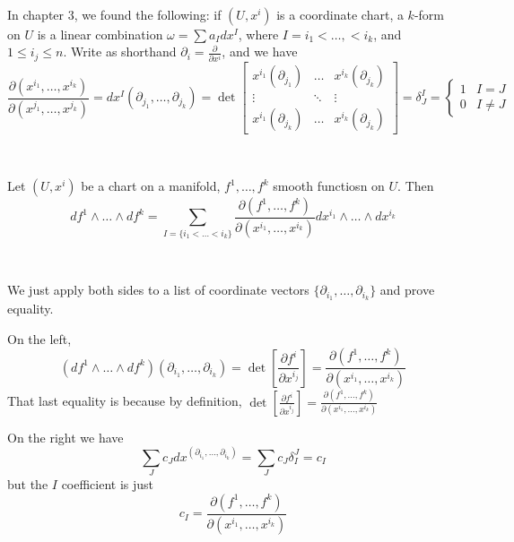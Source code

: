 \documentclass{article}
\begin{document}
\begin{remark}
  \

  In chapter 3, we found the following: if $(U,x^i)$ is a coordinate chart, a $k$-form on $U$ is a linear combination $\omega = \sum a_I dx^I$, where $I = i_1 < \dots, < i_k$, and $1 \leq i_j \leq n$. Write as shorthand $\partial_i = \frac{\partial}{\partial x^i}$, and we have $$\frac{\partial (x^{i_1}, \dots, x^{i_k})}{\partial (x^{j_1}, \dots, x^{j_k})} = dx^I(\partial_{j_1}, \dots, \partial_{j_k}) = \det
  \begin{bmatrix}
    x^{i_1}(\partial_{j_1}) & \dots & x^{i_k}(\partial_{j_k})\\
    \vdots & \ddots & \vdots\\
    x^{i_1}(\partial_{j_k}) & \dots& x^{i_k}(\partial_{j_k})
  \end{bmatrix} = \delta^I_J =
  \begin{cases}
    1 & I=J\\
    0 & I \neq J
  \end{cases}$$
\end{remark}

\begin{proposition}
  \

  Let $(U, x^i)$ be a chart on a manifold, $f^1, \dots, f^k$ smooth functiosn on $U$. Then $$df^1 \wedge \dots \wedge df^k = \sum_{I = \{i_1 < \dots < i_k\}} \frac{\partial(f^1,\dots, f^k)}{\partial(x^{i_1}, \dots, x^{i_k})} dx^{i_1} \wedge \dots \wedge dx^{i_k}$$
\end{proposition}

\begin{customproof}
  \

  We just apply both sides to a list of coordinate vectors $\{\partial_{i_1}, \dots, \partial_{i_k}\}$ and prove equality.

  On the left, $$(df^1 \wedge\dots\wedge df^k)(\partial_{i_1}, \dots, \partial_{i_k}) = \det[\frac{\partial f^i}{\partial x^{i_j}}] = \frac{\partial(f^1,\dots, f^k)}{\partial(x^{i_1}, \dots, x^{i_k})}$$That last equality is because by definition, $\det[\frac{\partial f^i}{\partial x^{i_j}}] = \frac{\partial(f^1,\dots, f^k)}{\partial(x^{i_1}, \dots, x^{i_k})}$

  On the right we have $$\sum_J c_J dx^(\partial_{i_1}, \dots, \partial_{i_k}) = \sum_J c_J\delta_I^J = c_I$$but the $I$ coefficient is just $$c_I = \frac{\partial(f^1,\dots, f^k)}{\partial(x^{i_1}, \dots, x^{i_k})}$$
\end{customproof}
\end{document}
